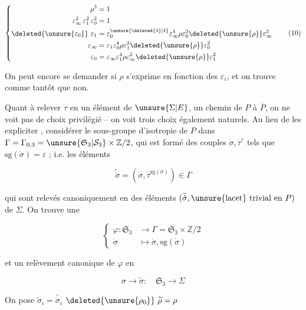 
\[
\left\{\begin{aligned}
\rho^3&=1\\
\varepsilon_\infty^2\,\varepsilon_1^2\,\varepsilon_0^2&=1\\
\deleted{\unsure{\varepsilon_0}}\ \varepsilon_1&=\varepsilon_0^{\unsure{\deleted{4}|4}}\varepsilon_\infty^4\rho\varepsilon_0^2\deleted{\unsure{\rho}}\varepsilon_\infty^2\\
\varepsilon_\infty&=\varepsilon_1\varepsilon_0^4\rho\varepsilon_1^2\deleted{\unsure{\rho}}\varepsilon_0^2\\
\varepsilon_0&=\varepsilon_\infty\varepsilon_1^4\rho\varepsilon_\infty^2\deleted{\unsure{\rho}}\varepsilon_1^2
\end{aligned}\right. \tag*{(10)}
\]


On peut encore se demander si $\rho$ s'exprime en fonction des $\varepsilon_i$, et on trouve comme tantôt que non.

Quant à relever $\dot\tau$ en un élément de $\unsure{\Sigma|E}$,  un chemin de $P$ à $\overline P$, on ne voit pas de choix privilégié -- on voit trois choix également naturels. Au lieu de les expliciter ,  considérer le sous-groupe d'isotropie de $P$ dans $\Gamma=\Gamma_{0,3}=\unsure{\mathfrak S_3|\mathcal S_3}\times\mathbb Z/2$, qui est formé des couples $\dot\sigma,\dot\tau^\varepsilon$ tels que $\mathrm{sg}(\dot\sigma)=\varepsilon$ ;  i.e. les éléments

\[
\widetilde{\dot\sigma}=(\dot\sigma,\dot\tau^{\mathrm{sg}(\dot\sigma)})\in\Gamma
\]

qui sont relevés canoniquement en des éléments $(\widetilde{\dot\sigma},\text{\unsure{lacet} trivial en }P)$ de $\Sigma$. On trouve une 

\[
\left\{\begin{aligned}
\varphi:\mathfrak S_3&\longrightarrow\Gamma=\mathfrak S_3\times\mathbb Z/2\\
\dot\sigma&\longmapsto\dot\sigma,\mathrm{sg}(\dot\sigma)
\end{aligned}\right. \tag*{(11)}
\]

et un relèvement canonique de $\varphi$ en

\[
\sigma\longrightarrow\widetilde\sigma:\quad\mathfrak S_3\longrightarrow\Sigma \tag*{(12)}
\]

On pose $\widetilde\sigma_i=\widetilde{\dot\sigma_i}$  $\deleted{\unsure{\rho_0}}\ \widetilde\rho=\rho$
